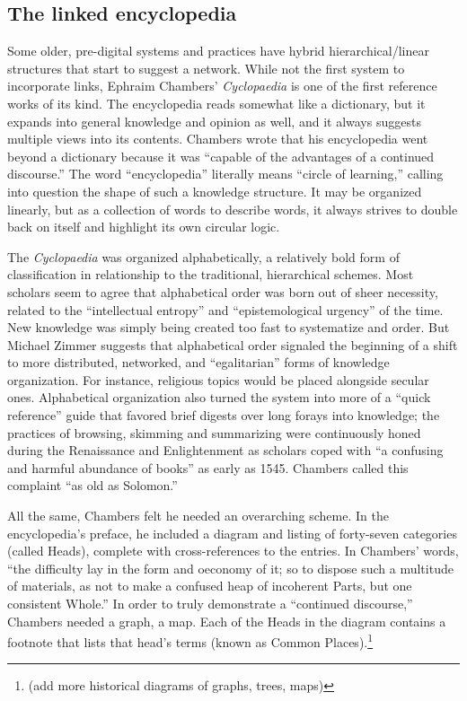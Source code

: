 \subsection{The linked encyclopedia}

Some older, pre-digital systems and practices have hybrid hierarchical/linear structures that start to suggest a network. While not the first system to incorporate links, Ephraim Chambers' \emph{Cyclopaedia} is one of the first reference works of its kind. The encyclopedia reads somewhat like a dictionary, but it expands into general knowledge and opinion as well, and it always suggests multiple views into its contents. Chambers wrote that his encyclopedia went beyond a dictionary because it was ``capable of the advantages of a continued discourse.''\autocite[64]{chambers_cyclopaedia_1728,yeo_solution_2003} The word ``encyclopedia'' literally means ``circle of learning,'' calling into question the shape of such a knowledge structure. It may be organized linearly, but as a collection of words to describe words, it always strives to double back on itself and highlight its own circular logic.

The \emph{Cyclopaedia} was organized alphabetically, a relatively bold form of classification in relationship to the traditional, hierarchical schemes. Most scholars seem to agree that alphabetical order was born out of sheer necessity, related to the ``intellectual entropy'' and ``epistemological urgency'' of the time.\autocite[5]{rosenberg_early_2003} New knowledge was simply being created too fast to systematize and order. But Michael Zimmer suggests that alphabetical order signaled the beginning of a shift to more distributed, networked, and ``egalitarian'' forms of knowledge organization.\autocite[100]{zimmer_renvois_2009} For instance, religious topics would be placed alongside secular ones. Alphabetical organization also turned the system into more of a ``quick reference'' guide that favored brief digests over long forays into knowledge; the practices of browsing, skimming and summarizing were continuously honed during the Renaissance and Enlightenment as scholars coped with ``a confusing and harmful abundance of books'' as early as 1545.\autocite{blair_reading_2003} Chambers called this complaint ``as old as Solomon.''\autocite[11]{yeo_solution_2003}

All the same, Chambers felt he needed an overarching scheme. In the encyclopedia's preface, he included a diagram and listing of forty-seven categories (called Heads), complete with cross-references to the entries. In Chambers' words, ``the difficulty lay in the form and oeconomy of it; so to dispose such a multitude of materials, as not to make a confused heap of incoherent Parts, but one consistent Whole.''\autocite[67]{yeo_solution_2003} In order to truly demonstrate a ``continued discourse,'' Chambers needed a graph, a map. Each of the Heads in the diagram contains a footnote that lists that head's terms (known as Common Places).\footnote{(add more historical diagrams of graphs, trees, maps)}

